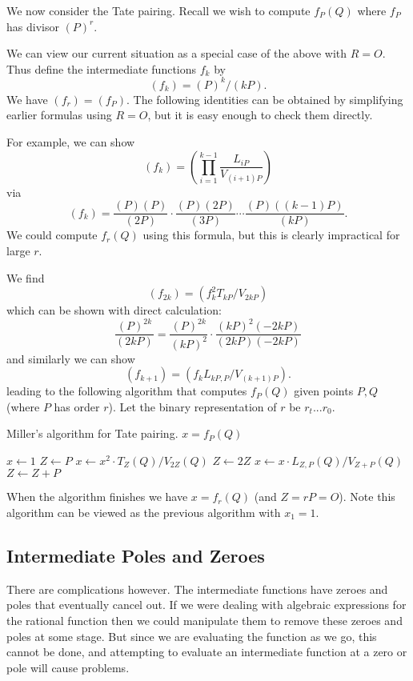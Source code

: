 We now consider the Tate pairing. Recall we wish to compute
$f_P(Q)$ where $f_P$ has divisor $(P)^r$.

We can view our current situation as a special case of the above
with $R = O$.
Thus define the intermediate functions $f_k$ by
\[ (f_k) = (P)^k / (kP) . \]
We have $(f_r) = (f_P)$.
The following identities can be obtained by simplifying
earlier formulas using $R=O$, but it is easy enough to check them directly.

For example, we can show
\[ (f_k) = \left(\prod_{i=1}^{k-1} \frac{L_{iP}}{V_{(i+1)P}}\right) \]
via
\[ (f_k) =
\frac{(P)(P)}{(2P)}
\cdot
\frac{(P)(2P)}{(3P)}
\cdots
\frac{(P)((k-1)P)}{(kP)} .
\]
We could compute $f_r(Q)$ using this formula,
but this is clearly impractical for large $r$.

We find
\[
(f_{2k}) = (f_k^2 T_{kP} / V_{2kP} )
\]
which can be shown with direct calculation:
\[
\frac{(P)^{2k}}{(2kP)} =
\frac{(P)^{2k}}{(kP)^2} \cdot
\frac{(kP)^2 (-2kP)}{(2kP)(-2kP)}
\]
and similarly we can show
\[
(f_{k+1}) = (f_k L_{kP,P} / V_{(k+1)P}).
\]
leading to the following algorithm that
computes $f_P(Q)$ given points $P,Q$ (where $P$ has order $r$).
Let the binary representation of $r$ be $r_t ... r_0$.

\begin{algorithm}
\caption{Miller's algorithm for Tate pairing. $x = f_P(Q)$}
\begin{algorithmic}[1]
\STATE $x \gets 1$
\STATE $Z \gets P$
    \STATE $x \gets x^2 \cdot T_Z(Q) / V_{2Z}(Q)$
    \STATE $Z \gets 2Z$
	\STATE $x \gets x \cdot L_{Z,P}(Q) / V_{Z+P}(Q)$
	\STATE $Z \gets Z + P$
    \ENDIF
\ENDFOR
\end{algorithmic}
\end{algorithm}

When the algorithm finishes we have $x = f_r(Q)$ (and $Z = rP = O$).
Note this algorithm can be viewed as the previous algorithm with $x_1 = 1$.

\subsection {Intermediate Poles and Zeroes}

There are complications however. The intermediate functions have zeroes
and poles that eventually cancel out. If we were dealing with algebraic
expressions for the rational function then we could manipulate
them to remove these zeroes and poles at some stage.
But since we are evaluating the function as we go,
this cannot be done, and attempting to evaluate an
intermediate function at a zero
or pole will cause problems.


